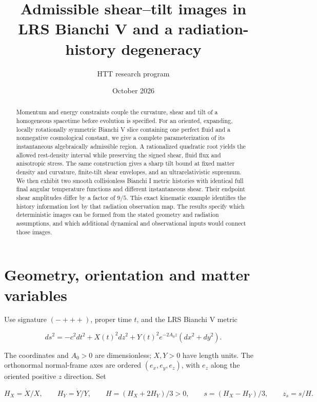\documentclass[aps,prd,reprint,onecolumn,nofootinbib]{revtex4-2}
\begin{document}
\title{Admissible shear--tilt images in LRS Bianchi V and a radiation-history degeneracy}
\author{HTT research program}
\date{October 2026}
\begin{abstract}

Momentum and energy constraints couple the curvature, shear and tilt of a homogeneous spacetime before evolution is specified. For an oriented, expanding, locally rotationally symmetric Bianchi V slice containing one perfect fluid and a nonnegative cosmological constant, we give a complete parameterization of its instantaneous algebraically admissible region. A rationalized quadratic root yields the allowed rest-density interval while preserving the signed shear, fluid flux and anisotropic stress. The same construction gives a sharp tilt bound at fixed matter density and curvature, finite-tilt shear envelopes, and an ultrarelativistic supremum. We then exhibit two smooth collisionless Bianchi I metric histories with identical full final angular temperature functions and different instantaneous shear. Their endpoint shear amplitudes differ by a factor of $9/5$. This exact kinematic example identifies the history information lost by that radiation observation map. The results specify which deterministic images can be formed from the stated geometry and radiation assumptions, and which additional dynamical and observational inputs would connect those images.

\end{abstract}
\maketitle

\hypertarget{geometry-orientation-and-matter-variables}{%
\section{Geometry, orientation and matter variables}\label{geometry-orientation-and-matter-variables}}

Use signature \((-+++)\), proper time \(t\), and the LRS Bianchi V metric

\[
 ds^2=-c^2dt^2+X(t)^2dz^2
       +Y(t)^2e^{-2A_0z}(dx^2+dy^2).
 \tag{1}
\]

The coordinates and \(A_0>0\) are dimensionless; \(X,Y>0\) have length units. The orthonormal normal-frame axes are ordered \((e_x,e_y,e_z)\), with \(e_z\) along the oriented positive \(z\) direction. Set

\[
 H_X=\dot X/X,\qquad H_Y=\dot Y/Y,\qquad
 H=(H_X+2H_Y)/3>0,\qquad s=(H_X-H_Y)/3,
 \qquad z_s=s/H.
 \tag{2}
\]
\end{document}

